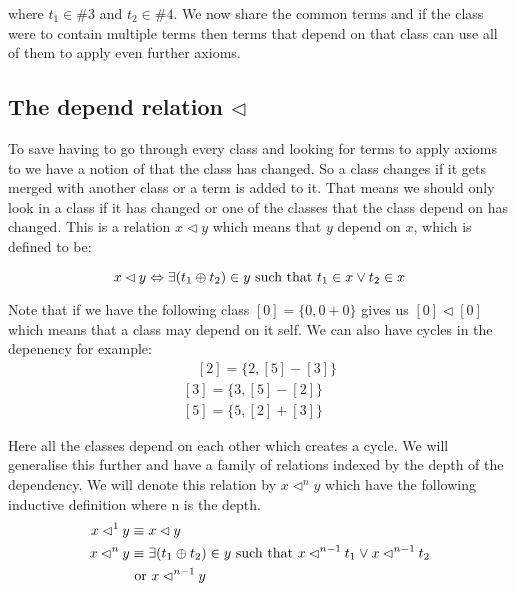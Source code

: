 where $t_1 \in \#3$ and $t_2 \in \#4$. We now share the common terms and if the
class were to contain multiple terms then terms that depend on that class can
use all of them to apply even further axioms. 

\subsection{The depend relation $\lhd$}
To save having to go through every class and looking for terms to apply axioms to
we have a notion of that the class has changed. So a class changes if it gets merged
with another class or a term is added to it. That means we should only look in a
class if it has changed or one of the classes that the class depend on has changed.
This is a relation $x \lhd y$ which means that $y$ depend
on $x$, which is defined to be:  

\begin{equation*}
x \lhd y \Leftrightarrow \exists (t_1 \oplus t_2) \in y \text{ such that } t_1 \in x
\vee t_2 \in x
\end{equation*}

Note that if we have the following class $[0] = \{0, 0 + 0\}$ gives us $[0] \lhd [0]$
which means that a class may depend on it self. We can also have cycles in the depenency
for example:
\begin{equation*}
\begin{aligned}
\quad [2] = \{ 2 , [5] - [3] \} \\ %
[3] = \{ 3 , [5] - [2] \} \\
[5] = \{ 5 , [2] + [3] \}
\end{aligned}
\end{equation*}

Here all the classes depend on each other which creates a cycle. We will generalise
this further and have a family of relations indexed by the depth of the dependency.
We will denote this relation by $x \lhd^n y$ which have the following inductive
definition where n is the depth.
\begin{equation*}
\begin{aligned}
x \lhd^1 y &\equiv x \lhd y \\
x \lhd^n y &\equiv \exists (t_1 \oplus t_2) \in y \text { such that } 
x \lhd^{n-1} t_1 \vee x \lhd^{n-1} t_2 \\
& \text{ or } x \lhd^{n-1} y
\end{aligned}
\end{equation*}



